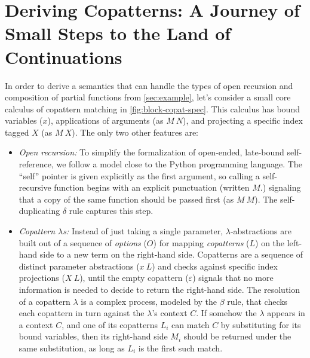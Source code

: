 \documentclass[sigplan,screen]{acmart}
\begin{document}
\section{Deriving Copatterns: A Journey of Small Steps to the Land of Continuations}
\label{sec:derive-copat}


In order to derive a semantics that can handle the types of open recursion and
composition of partial functions from \cref{sec:example}, let's consider a small
core calculus of copattern matching in \cref{fig:block-copat-spec}.  This
calculus has bound variables ($x$), applications of arguments (as $M~N$), and
projecting a specific index tagged $X$ (as $M~X$).  The only two other features
are:
\begin{itemize}
\item \emph{Open recursion:} To simplify the formalization of open-ended,
  late-bound self-reference, we follow a model close to the Python programming
  language.  The ``self'' pointer is given explicitly as the first argument, so
  calling a self-recursive function begins with an explicit punctuation (written
  $M.$) signaling that a copy of the same function should be passed first (as
  $M~M$).  The self-duplicating $\delta$ rule captures this step.
\item \emph{Copattern $\lambda$s:} Instead of just taking a single parameter,
  $\lambda$-abstractions are built out of a sequence of \emph{options} ($O$) for
  mapping \emph{copatterns} ($L$) on the left-hand side to a new term on the
  right-hand side.  Copatterns are a sequence of distinct parameter abstractions
  ($x~L$) and checks against specific index projections ($X~L$), until the empty
  copattern ($\varepsilon$) signals that no more information is needed to decide
  to return the right-hand side.  The resolution of a copattern $\lambda$ is a
  complex process, modeled by the $\beta$ rule, that checks each copattern in
  turn against the $\lambda$'s context $C$.  If somehow the $\lambda$ appears in
  a context $C$, and one of its copatterns $L_i$ can match $C$ by substituting
  for its bound variables, then its right-hand side $M_i$ should be returned
  under the same substitution, as long as $L_i$ is the first such match.
\end{itemize}
\end{document}
